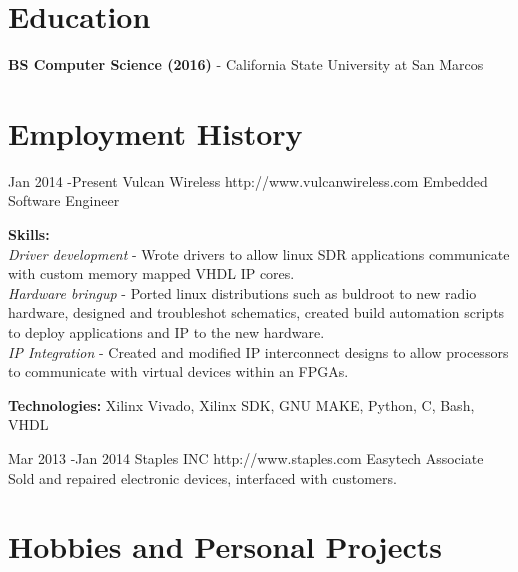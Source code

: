 \documentclass[10pt]{article} %
\begin{document}
\section{Education}

\textbf{BS Computer Science (2016)} - California State University at San Marcos




\section{Employment History}

\job
{Jan 2014 -}{Present}
{Vulcan Wireless}
{http://www.vulcanwireless.com}
{Embedded Software Engineer}
{\textbf{Skills:}\\
\textit{Driver development} - Wrote drivers to allow linux SDR applications communicate with custom memory mapped VHDL IP cores. \\
\textit{Hardware bringup} - Ported linux distributions such as buldroot to new radio hardware, designed and troubleshot schematics, created build automation scripts to deploy applications and IP to the new hardware.\\
\textit{IP Integration} - Created and modified IP interconnect designs to allow processors to communicate with virtual devices within an FPGAs.\\
\rule{0mm}{5mm}\textbf{Technologies:} Xilinx Vivado, Xilinx SDK, GNU MAKE, Python, C, Bash, VHDL}


\job
{Mar 2013 -}{Jan 2014}
{Staples INC}
{http://www.staples.com}
{Easytech Associate}
{Sold and repaired electronic devices, interfaced with customers.}


\section {Hobbies and Personal Projects}
\end{document}
